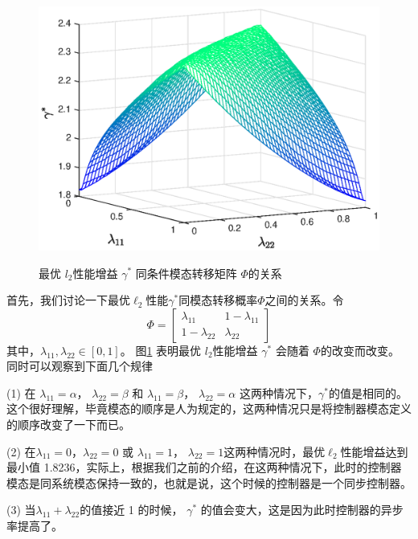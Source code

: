 \begin{figure}[!htb] 
	\centering\includegraphics[scale=0.6]{./figures/lure_system/3d3.eps}\\ 
	\caption{最优 $l_2$性能增益 $\gamma^{*}$ 同条件模态转移矩阵 $\varPhi$的关系}
	\label{lure_fig1}
\end{figure}

首先，我们讨论一下最优$\ell_2$性能$\gamma^{*}$同模态转移概率$\varPhi$之间的关系。令
\begin{equation*}
\varPhi=\begin{bmatrix}
\lambda_{11}&1-\lambda_{11} \\
1-\lambda_{22}&\lambda_{22}
\end{bmatrix}
\end{equation*}
其中，$\lambda_{11},\lambda_{22} \in [0,1]$。 图\ref{lure_fig1} 表明最优 $l_2$性能增益 $\gamma^{*}$ 会随着 $\varPhi$的改变而改变。 同时可以观察到下面几个规律

	(1) 在 $\lambda_{11}=\alpha$， $\lambda_{22}=\beta$ 和 $\lambda_{11}=\beta$， $\lambda_{22}=\alpha$ 这两种情况下，$\gamma^{*}$的值是相同的。这个很好理解，毕竟模态的顺序是人为规定的，这两种情况只是将控制器模态定义的顺序改变了一下而已。
	
	(2) 在$\lambda_{11}=0$，$\lambda_{22}=0$ 或 $\lambda_{11}=1$， $\lambda_{22}=1$这两种情况时，最优$\ell_2$性能增益达到最小值 1.8236，实际上，根据我们之前的介绍，在这两种情况下，此时的控制器模态是同系统模态保持一致的，也就是说，这个时候的控制器是一个同步控制器。
	
	(3) 当$\lambda_{11}+\lambda_{22}$的值接近 1 的时候，	$\gamma^{*}$ 的值会变大，这是因为此时控制器的异步率提高了。


